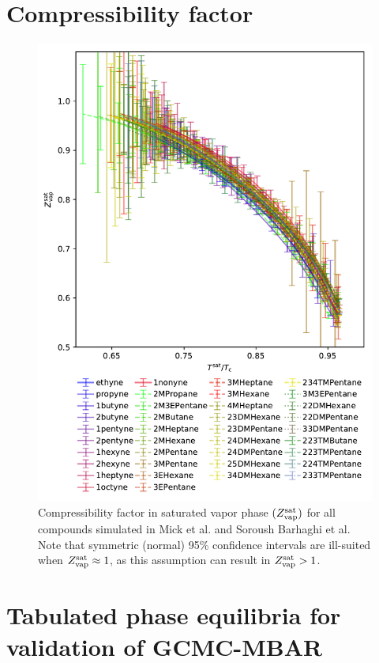 \documentclass[journal=jctc,manuscript=article]{achemso}
\begin{document}
\newpage
\clearpage


\section{Compressibility factor} \label{SI sec: Z}

\begin{figure}[htb!]
	\centering
	\includegraphics[width=4.8in]{Compressibility_factor_all.pdf}
	\caption{Compressibility factor in saturated vapor phase $(Z^{\rm sat}_{\rm vap})$ for all compounds simulated in Mick et al. and Soroush Barhaghi et al. Note that symmetric (normal) 95\% confidence intervals are ill-suited when $Z^{\rm sat}_{\rm vap} \approx 1$, as this assumption can result in $Z^{\rm sat}_{\rm vap} > 1$.}
	\label{SI fig:Z}
\end{figure}

\newpage
\clearpage

\section{Tabulated phase equilibria for validation of GCMC-MBAR} \label{SI sec: Tabulated MBAR results}
\end{document}
